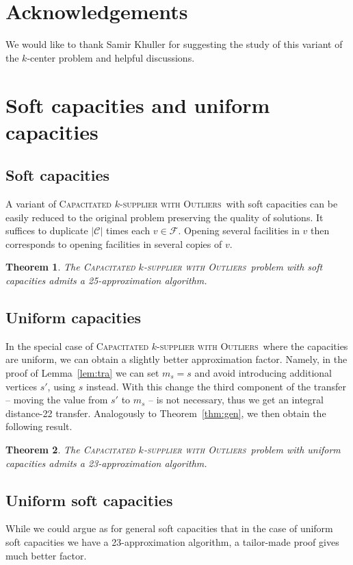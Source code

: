 \documentclass{article}
\newcommand{\F}{\mathcal{F}}
\newcommand{\C}{\mathcal{C}}
\newcommand{\fullsup}{\textsc{Capacitated} $k$-\textsc{supplier with Outliers}}
\theoremstyle{plain}
\newtheorem{theorem}{Theorem}
\theoremstyle{definition}
\begin{document}
\section*{Acknowledgements}

We would like to thank Samir Khuller for suggesting the study of this variant
of the $k$-{\sc center} problem and helpful discussions.





\newpage
\appendix

\section{Soft capacities and uniform capacities}\label{sec:improvements}
\label{app:improvements}
\subsection{Soft capacities}
A variant of \fullsup\ with soft capacities can be easily reduced to the
original problem preserving the quality of solutions.
It suffices to duplicate $|\C|$ times each $v\in \F$.
Opening several facilities in $v$ then corresponds to opening facilities in
several copies of $v$.
\begin{theorem}
The \fullsup\  problem with soft capacities admits a 25-approximation algorithm.
\end{theorem}

\subsection{Uniform capacities}
In the special case of \fullsup\  where the capacities are uniform,
we can obtain a slightly better approximation factor.
Namely, in the proof of Lemma~\ref{lem:tra} 
we can set $m_s=s$ and avoid introducing additional vertices $s'$, using $s$ instead. With this change the
third component of the transfer -- moving the value from $s'$ to $m_s$ -- is not
necessary, thus we get an integral distance-22 transfer. Analogously to
Theorem~\ref{thm:gen}, we then obtain the following result.
\begin{theorem}
The \fullsup\  problem with uniform capacities admits a 23-approximation algorithm.
\end{theorem}

\subsection{Uniform soft capacities}
While we could argue as for general soft capacities that in the case of uniform
soft capacities we have a 23-approximation algorithm, a tailor-made proof gives
much better factor.
\end{document}
